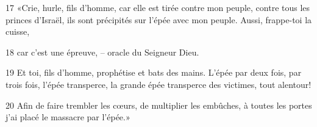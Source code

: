 17 «Crie, hurle, fils d’homme, car elle est tirée contre mon peuple, contre tous les princes d’Israël, ils sont précipités sur l’épée avec mon peuple. Aussi, frappe-toi la cuisse,

18 car c’est une épreuve, – oracle du Seigneur Dieu.

19 Et toi, fils d’homme, prophétise et bats des mains. L’épée par deux fois, par trois fois, l’épée transperce, la grande épée transperce des victimes, tout alentour!

20 Afin de faire trembler les cœurs, de multiplier les embûches, à toutes les portes j’ai placé le massacre par l’épée.»